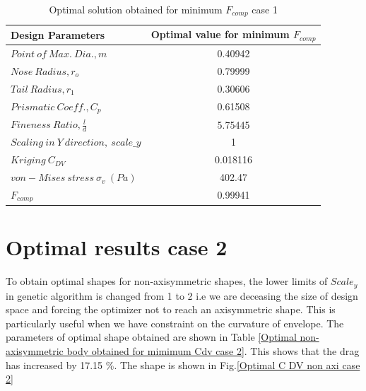 \begin{table}[H]
	\centering
	\caption{Optimal solution obtained for minimum $ F_{comp} $ case 1} 
	\label{Optimal solution obtained for mimimum F comp case 1}
	\begin{tabular}{lc}
		\hline \hline
		Design Parameters & Optimal value for minimum $ F_{comp} $    \\ \hline \hline
		
		$ Point\ of\ Max.\ Dia., m$ & 0.40942      \\  
		$ Nose\ Radius, r _{o} $ & 0.79999    \\
		$ Tail\ Radius, r _{1} $ & 0.30606    \\  
		$ Prismatic\ Coeff., C _{p }$ & 0.61508 \\
		$ Fineness\ Ratio, \frac{l}{d} $ & 5.75445 \\
		$Scaling\ in\ Y\ direction,\ scale\_y$ &1 \\ 
		\hline \hline
		$ Kriging\ C_{DV} $ & 0.018116 \\
		$ von-Mises\ stress\  \sigma _{v} \ (Pa) $ & 402.47 \\
		$ F_{comp}$ & 0.99941 \\
		\hline \hline
	\end{tabular}
\end{table}

\section{Optimal results case 2}
To obtain optimal shapes for non-axisymmetric shapes, the lower limits of $ Scale_y $ in genetic algorithm is changed from 1 to 2 i.e we are deceasing the size of design space and forcing the optimizer not to reach an axisymmetric shape. This is particularly useful when we have constraint on the curvature of envelope. The parameters of optimal shape obtained are shown in Table \ref{Optimal non-axisymmetric body obtained for mimimum Cdv case 2}. This shows that the drag has increased by 17.15 \%. The shape is shown in Fig.\ref{Optimal C DV non axi case 2}

